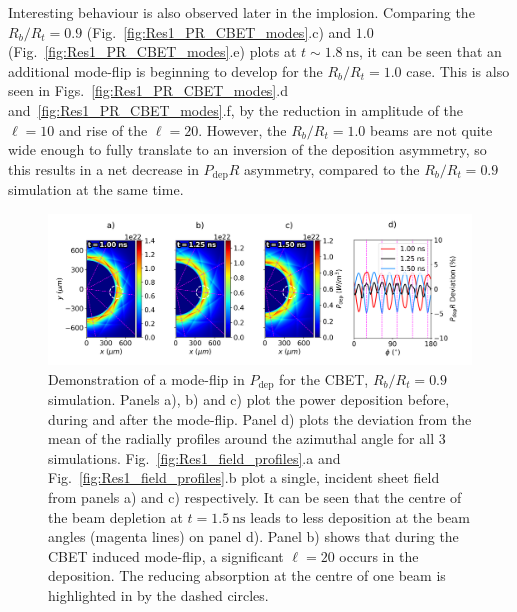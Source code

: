 Interesting behaviour is also observed later in the implosion.
Comparing the $R_b/R_t=0.9$ (Fig.~\ref{fig:Res1_PR_CBET_modes}.c) and $1.0$ (Fig.~\ref{fig:Res1_PR_CBET_modes}.e) plots at $t\sim1.8\ \text{ns}$, it can be seen that an additional mode-flip is beginning to develop for the $R_b/R_t=1.0$ case.
This is also seen in Figs.~\ref{fig:Res1_PR_CBET_modes}.d and~\ref{fig:Res1_PR_CBET_modes}.f, by the reduction in amplitude of the $\ell=10$ and rise of the $\ell=20$.
However, the $R_b/R_t=1.0$ beams are not quite wide enough to fully translate to an inversion of the deposition asymmetry, so this results in a net decrease in $P_{\text{dep}}R$ asymmetry, compared to the $R_b/R_t=0.9$ simulation at the same time.

\begin{figure}[t!]
    \includegraphics[width=\linewidth]{Results1/Images/CBET_modeflip.png}
    \centering
    \caption{Demonstration of a mode-flip in $P_{\text{dep}}$ for the \ac{CBET}, $R_b/R_t=0.9$ simulation.
    Panels a), b) and c) plot the power deposition before, during and after the mode-flip.
    Panel d) plots the deviation from the mean of the radially profiles around the azimuthal angle for all 3 simulations.
    Fig.~\ref{fig:Res1_field_profiles}.a and Fig.~\ref{fig:Res1_field_profiles}.b plot a single, incident sheet field from panels a) and c) respectively.
    It can be seen that the centre of the beam depletion at $t=1.5\ \text{ns}$ leads to less deposition at the beam angles (magenta lines) on panel d).
    Panel b) shows that during the \ac{CBET} induced mode-flip, a significant $\ell=20$ occurs in the deposition.
    The reducing absorption at the centre of one beam is highlighted in by the dashed circles.}%
    \label{fig:Res1_CBET_Deposition_change}
\end{figure}


